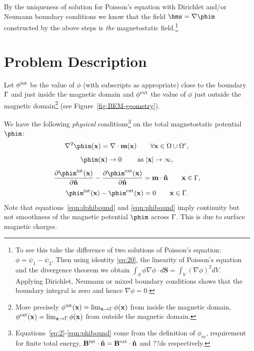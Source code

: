 By the uniqueness of solution for Poisson's equation with Dirichlet and/or Neumann boundary conditions we know that the field $ \hms = \nabla \phim$  constructed by the above steps is \emph{the} magnetostatic field.\footnote{To see this take the difference of two solutions of Poisson's equation: $\phi = \psi_1 - \psi_2$. Then using identity \eqref{eq:20}, the linearity of Poisson's equation and the divergence theorem we obtain $\int_S \phi \nabla \phi \cdot d \mathbf{S} = \int_V (\nabla \phi)^2 dV$. Applying Dirichlet, Neumann or mixed boundary conditions shows that the boundary integral is zero and hence $\nabla \phi = 0$.}

\section{Problem Description}
\label{sec:problem-description}
Let $\phi^{\text{int}}$ be the value of $\phi$ (with subscripts as appropriate) close to the boundary ${\Gamma}$ and just inside the magnetic domain  and $\phi^{\text{ext}}$ the value of $\phi$ just outside the magnetic domain\footnote{More precisely $\phi^{\text{int}}(\mathbf{x}) = \lim_{\mathbf{x} \rightarrow {\Gamma}} \phi(\mathbf{x})$ from inside the magnetic domain, $\phi^{\text{ext}}(\mathbf{x}) = \lim_{\mathbf{x} \rightarrow {\Gamma}} \phi(\mathbf{x})$ from outside the magnetic domain.} (see Figure~\ref{fig:BEM-geometry}).

We have the following \emph{physical} conditions\footnote{Equations~\eqref{eq:2}-\eqref{eqn:phibound} come from the definition of $\phi_m$, requirement for finite total energy, $\mathbf{B}^\text{int} \cdot \mathbf{\hat{n}} = \mathbf{B}^\text{ext} \cdot \mathbf{\hat{n}}$ and ??ds respectively.} on the total magnetostatic potential $\phim$:
\begin{equation}
  \lap \phim(\xv) = \nabla \cdot \mv(\xv) \qquad \forall \xv \in \magd \cup \extd,
  \label{eq:2}
\end{equation}
\begin{equation}
  \phim(\xv) \rightarrow 0 \qquad \text{ as } \abs{\xv} \rightarrow \infty,
\end{equation}
\begin{equation}
  \pd{\phim^\inte(\xv)}{\nv} - \pd{\phim^\exte(\xv)}{\nv} = \mv \cdot \nv \qquad \xv \in \boundd,
  \label{eqn:dphibound}
\end{equation}
\begin{equation}
  \phim^\inte(\xv) - \phim^\exte(\xv)  = 0 \qquad \xv \in \boundd.
  \label{eqn:phibound}
\end{equation}
Note that equations~\eqref{eqn:dphibound} and \eqref{eqn:phibound} imply continuity but not smoothness of the magnetic potential $\phim$ across ${\Gamma}$. This is due to surface magnetic charges.


